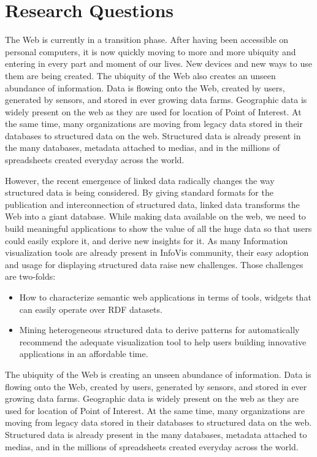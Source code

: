 \section{Research Questions}
\label{sec:questions}

The Web is currently in a transition phase. After having been accessible on personal computers, it is now 
quickly moving to more and more ubiquity and entering in every part and moment of our lives. New 
devices and new ways to use them are being created. The ubiquity of the Web also creates an unseen 
abundance of information. Data is flowing onto the Web, created by users, generated by sensors, and 
stored in ever growing data farms. Geographic data is widely present on the web as they are used for location 
of Point of Interest. At the same time, many organizations are moving from legacy data stored in their databases
to structured data on the web. Structured data is already present in the many databases, metadata attached to medias, and in the millions of spreadsheets created everyday across the world. 


However, the recent emergence of linked data radically changes the way structured data is being considered. By giving standard formats for the publication and interconnection of structured data, linked data transforms the Web into a giant database. While making data available on the web, we need to build meaningful applications to show the value of all the huge data so that users could easily explore it, and derive new insights for it. As many Information visualization tools are already present in InfoVis community, their easy adoption and usage for displaying structured data raise new challenges. Those challenges are two-folds:
\begin{itemize}
\item How to characterize semantic web applications in terms of tools, widgets that can easily operate over RDF datasets.
\item Mining heterogeneous structured data to derive patterns for automatically recommend the adequate visualization tool to help users building innovative applications in an affordable time.
\end{itemize}

The ubiquity of the Web is creating an unseen abundance of information. Data is flowing onto the Web, created by users, generated by sensors, and 
stored in ever growing data farms. Geographic data is widely present on the web as they are used for location of Point of Interest. At the same time, many organizations are moving from legacy data stored in their databases to structured data on the web. Structured data is already present in the many databases, metadata attached to medias, and in the millions of spreadsheets created everyday across the world. 

